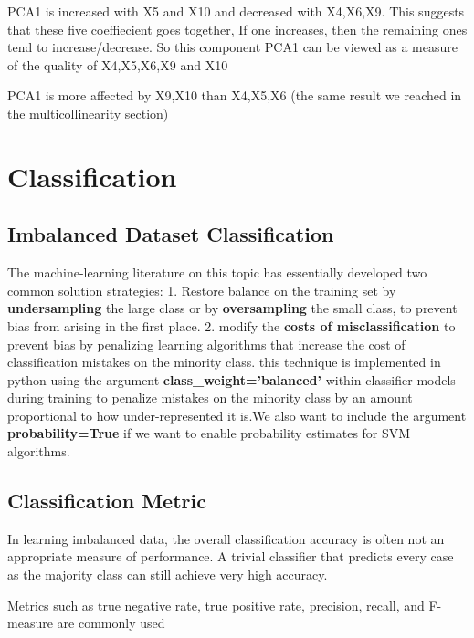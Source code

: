 \documentclass[11pt]{article}
\begin{document}
    PCA1 is increased with X5 and X10 and decreased with X4,X6,X9. This
suggests that these five coeffiecient goes together, If one increases,
then the remaining ones tend to increase/decrease. So this component
PCA1 can be viewed as a measure of the quality of X4,X5,X6,X9 and X10

PCA1 is more affected by X9,X10 than X4,X5,X6 (the same result we
reached in the multicollinearity section)

    \hypertarget{classification}{%
\section{Classification}\label{classification}}

    \hypertarget{imbalanced-dataset-classification}{%
\subsection{Imbalanced Dataset
Classification}\label{imbalanced-dataset-classification}}

    The machine-learning literature on this topic has essentially developed
two common solution strategies: 1. Restore balance on the training set
by \textbf{undersampling} the large class or by \textbf{oversampling}
the small class, to prevent bias from arising in the first place. 2.
modify the \textbf{costs of misclassification} to prevent bias by
penalizing learning algorithms that increase the cost of classification
mistakes on the minority class. this technique is implemented in python
using the argument \textbf{class\_weight='balanced'} within classifier
models during training to penalize mistakes on the minority class by an
amount proportional to how under-represented it is.We also want to
include the argument \textbf{probability=True} if we want to enable
probability estimates for SVM algorithms.

    \hypertarget{classification-metric}{%
\subsection{Classification Metric}\label{classification-metric}}

    In learning imbalanced data, the overall classification accuracy is
often not an appropriate measure of performance. A trivial classifier
that predicts every case as the majority class can still achieve very
high accuracy.

Metrics such as true negative rate, true positive rate, precision,
recall, and F-measure are commonly used
\end{document}
